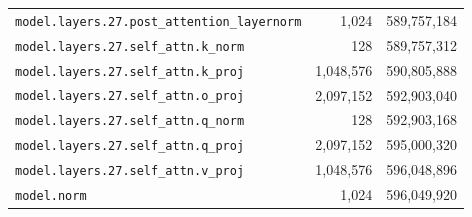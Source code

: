\documentclass[10pt,a4paper]{article}
\theoremstyle{definition}
\begin{document}
\begin{appendices}
\begin{longtable}{p{9.5cm}rr}
\texttt{model.\allowbreak{}layers.\allowbreak{}27.\allowbreak{}post\_attention\_layernorm} & 1,024 & 589,757,184 \\
\texttt{model.\allowbreak{}layers.\allowbreak{}27.\allowbreak{}self\_attn.\allowbreak{}k\_norm} & 128 & 589,757,312 \\
\texttt{model.\allowbreak{}layers.\allowbreak{}27.\allowbreak{}self\_attn.\allowbreak{}k\_proj} & 1,048,576 & 590,805,888 \\
\texttt{model.\allowbreak{}layers.\allowbreak{}27.\allowbreak{}self\_attn.\allowbreak{}o\_proj} & 2,097,152 & 592,903,040 \\
\texttt{model.\allowbreak{}layers.\allowbreak{}27.\allowbreak{}self\_attn.\allowbreak{}q\_norm} & 128 & 592,903,168 \\
\texttt{model.\allowbreak{}layers.\allowbreak{}27.\allowbreak{}self\_attn.\allowbreak{}q\_proj} & 2,097,152 & 595,000,320 \\
\texttt{model.\allowbreak{}layers.\allowbreak{}27.\allowbreak{}self\_attn.\allowbreak{}v\_proj} & 1,048,576 & 596,048,896 \\
\texttt{model.\allowbreak{}norm} & 1,024 & 596,049,920 \\
\end{longtable}
\end{appendices}
\end{document}
